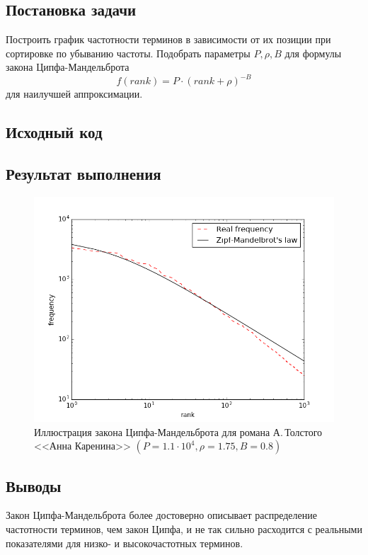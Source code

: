 \documentclass[a4paper, 12pt]{article}
\begin{document}

\newpage


\subsection*{Постановка задачи}
Построить график частотности терминов в зависимости от их позиции при сортировке по убыванию частоты. Подобрать параметры $P, \rho, B$ для формулы закона Ципфа-Мандельброта
$$f(rank) = P \cdot {(rank + \rho)}^{-B}$$
для наилучшей аппроксимации.


\subsection*{Исходный код}



\subsection*{Результат выполнения}
\begin{figure}[!htb]
	\centering
	\includegraphics[scale=0.8]{mandelbrot.png}
	\caption{Иллюстрация закона Ципфа-Мандельброта для романа А.\,Толстого <<Анна Каренина>> $(P = 1.1 \cdot {10}^4, \rho = 1.75, B = 0.8)$}
\end{figure}

\subsection*{Выводы}
Закон Ципфа-Мандельброта более достоверно описывает распределение частотности терминов, чем закон Ципфа, и не так сильно расходится с реальными показателями для низко- и высокочастотных терминов.
\end{document}
